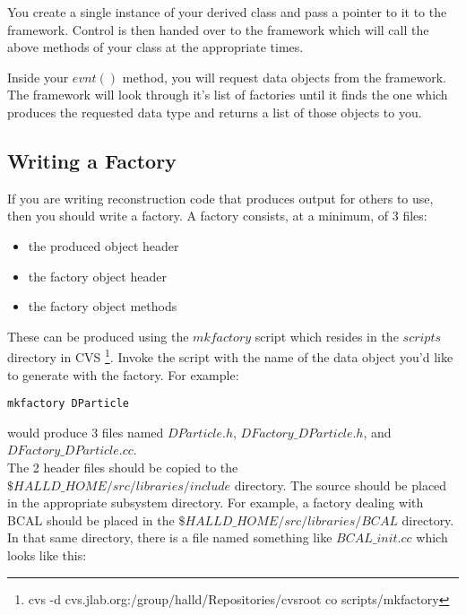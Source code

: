 \documentclass[12pt]{article}
\begin{document}
You create a single instance of your derived class and pass a pointer
to it to the framework. Control is then
handed over to the framework which will call the above methods of your
class at the appropriate times.

Inside your $evnt()$ method, you will request data objects from the 
framework. The framework will look through it's list of factories
until it finds the one which produces the requested data type and returns
a list of those objects to you.

\subsection{Writing a Factory}
\label{factory}
If you are writing reconstruction code that produces output for others
to use, then you should write a factory. A factory consists, at a
minimum, of 3 files:

\begin{itemize}
	\item{the produced object header}
	\item{the factory object header}
	\item{the factory object methods}
\end{itemize}
These can be produced using the $mkfactory$ script which resides in
the $scripts$ directory in CVS
\footnote{cvs -d cvs.jlab.org:/group/halld/Repositories/cvsroot co scripts/mkfactory}.
Invoke the script with the name of the data object you'd like to
generate with the factory. For example:

\begin{lstlisting}[frame=shadowbox,backgroundcolor=\color{cmdbkgd}]
mkfactory DParticle
\end{lstlisting}

would produce 3 files named $DParticle.h$, $DFactory\_DParticle.h$,
and $DFactory\_DParticle.cc$.\\

The 2 header files should be copied to the $\$HALLD\_HOME/src/libraries/include$
directory. The source should be placed in the appropriate subsystem
directory. For example, a factory dealing with BCAL should be placed
in the $\$HALLD\_HOME/src/libraries/BCAL$ directory. In that same
directory, there is a file named something like $BCAL\_init.cc$
which looks like this:


\end{document}

